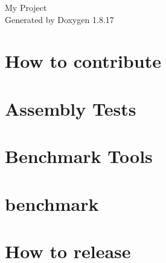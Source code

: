 \let\mypdfximage\pdfximage\def\pdfximage{\immediate\mypdfximage}\documentclass[twoside]{book}
\newcommand{\+}{\discretionary{\mbox{\scriptsize$\hookleftarrow$}}{}{}}
\newcommand{\clearemptydoublepage}{%
  \newpage{\pagestyle{empty}\cleardoublepage}%
}
\begin{document}
\hypersetup{pageanchor=false,
             bookmarksnumbered=true,
             pdfencoding=unicode
            }
\begin{titlepage}
\vspace*{7cm}
\begin{center}%
{\Large My Project }\\
\vspace*{1cm}
{\large Generated by Doxygen 1.8.17}\\
\end{center}
\end{titlepage}
\clearemptydoublepage
{}
\tableofcontents
\clearemptydoublepage
{}
\hypersetup{pageanchor=true}

\chapter{How to contribute}
\label{md_json-develop_benchmarks_thirdparty_benchmark_CONTRIBUTING}

\chapter{Assembly Tests}
\label{md_json-develop_benchmarks_thirdparty_benchmark_docs_AssemblyTests}

\chapter{Benchmark Tools}
\label{md_json-develop_benchmarks_thirdparty_benchmark_docs_tools}

\chapter{benchmark}
\label{md_json-develop_benchmarks_thirdparty_benchmark_README}

\chapter{How to release}
\label{md_json-develop_benchmarks_thirdparty_benchmark_releasing}

\end{document}
